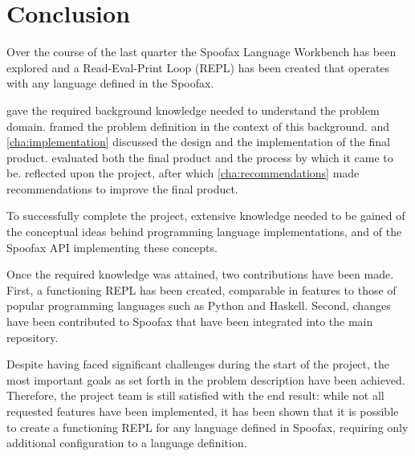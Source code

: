 \chapter{Conclusion}
\label{cha:conclusion}

Over the course of the last quarter the Spoofax Language Workbench has been
explored and a Read-Eval-Print Loop (REPL) has been created that operates with
any language defined in the Spoofax.

 gave the required background knowledge needed to
understand the problem domain.  framed the problem
definition in the context of this background.  and
\cref{cha:implementation} discussed the design and the implementation of the
final product.  evaluated both the final product and the
process by which it came to be.  reflected upon the
project, after which \cref{cha:recommendations} made recommendations to improve
the final product.

To successfully complete the project, extensive knowledge needed to be gained of
the conceptual ideas behind programming language implementations, and of the
Spoofax API implementing these concepts.

Once the required knowledge was attained, two contributions have been
made. First, a functioning REPL has been created,
comparable in features to those of popular programming languages such as Python
and Haskell. Second, changes have been contributed to Spoofax that
have been integrated into the main repository.

Despite having faced significant challenges during the start of the project, the
most important goals as set forth in the problem description have been achieved.
Therefore, the project team is still satisfied with the end result: while
not all requested features have been implemented, it has been shown that it is
possible to create a functioning REPL for any language defined in Spoofax,
requiring only additional configuration to a language definition.

